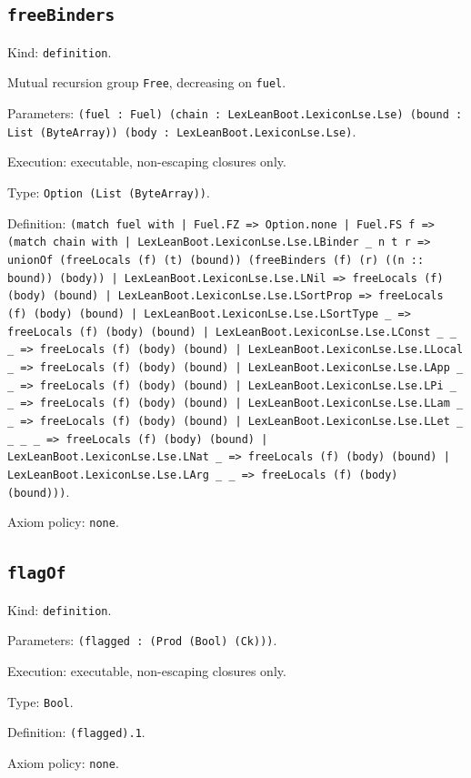 \documentclass[11pt]{article}
\begin{document}
\subsection*{\texttt{freeBinders}}
\noindent Kind: \texttt{definition}.\par
\noindent Mutual recursion group \texttt{Free}, decreasing on \texttt{fuel}.\par
\noindent Parameters: \texttt{(fuel : Fuel) (chain : LexLeanBoot.LexiconLse.Lse) (bound : List (ByteArray)) (body : LexLeanBoot.LexiconLse.Lse)}.\par
\noindent Execution: executable, non-escaping closures only.\par
\noindent Type: \texttt{Option (List (ByteArray))}.\par
\noindent Definition: \texttt{(match fuel with | Fuel.FZ => Option.none | Fuel.FS f => (match chain with | LexLeanBoot.LexiconLse.Lse.LBinder \_ n t r => unionOf (freeLocals (f) (t) (bound)) (freeBinders (f) (r) ((n :: bound)) (body)) | LexLeanBoot.LexiconLse.Lse.LNil => freeLocals (f) (body) (bound) | LexLeanBoot.LexiconLse.Lse.LSortProp => freeLocals (f) (body) (bound) | LexLeanBoot.LexiconLse.Lse.LSortType \_ => freeLocals (f) (body) (bound) | LexLeanBoot.LexiconLse.Lse.LConst \_ \_ \_ => freeLocals (f) (body) (bound) | LexLeanBoot.LexiconLse.Lse.LLocal \_ => freeLocals (f) (body) (bound) | LexLeanBoot.LexiconLse.Lse.LApp \_ \_ => freeLocals (f) (body) (bound) | LexLeanBoot.LexiconLse.Lse.LPi \_ \_ => freeLocals (f) (body) (bound) | LexLeanBoot.LexiconLse.Lse.LLam \_ \_ => freeLocals (f) (body) (bound) | LexLeanBoot.LexiconLse.Lse.LLet \_ \_ \_ \_ => freeLocals (f) (body) (bound) | LexLeanBoot.LexiconLse.Lse.LNat \_ => freeLocals (f) (body) (bound) | LexLeanBoot.LexiconLse.Lse.LArg \_ \_ => freeLocals (f) (body) (bound)))}.\par
\noindent Axiom policy: \texttt{none}.\par
\subsection*{\texttt{flagOf}}
\noindent Kind: \texttt{definition}.\par
\noindent Parameters: \texttt{(flagged : (Prod (Bool) (Ck)))}.\par
\noindent Execution: executable, non-escaping closures only.\par
\noindent Type: \texttt{Bool}.\par
\noindent Definition: \texttt{(flagged).1}.\par
\noindent Axiom policy: \texttt{none}.\par
\end{document}
